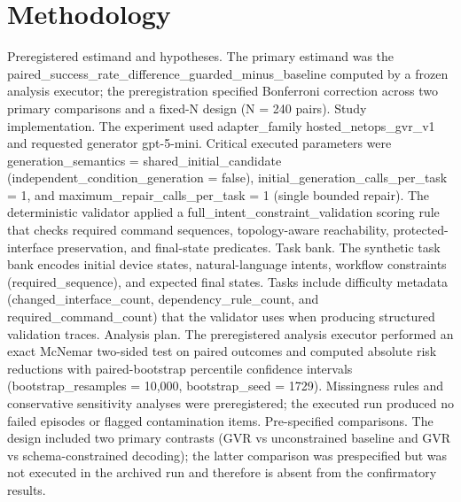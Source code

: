 \documentclass[conference]{IEEEtran}
\begin{document}
\section{Methodology}
Preregistered estimand and hypotheses. The primary estimand was the paired\_success\_rate\_difference\_guarded\_minus\_baseline computed by a frozen analysis executor; the preregistration specified Bonferroni correction across two primary comparisons and a fixed-N design (N = 240 pairs). Study implementation. The experiment used adapter\_family hosted\_netops\_gvr\_v1 and requested generator gpt-5-mini. Critical executed parameters were generation\_semantics = shared\_initial\_candidate (independent\_condition\_generation = false), initial\_generation\_calls\_per\_task = 1, and maximum\_repair\_calls\_per\_task = 1 (single bounded repair). The deterministic validator applied a full\_intent\_constraint\_validation scoring rule that checks required command sequences, topology-aware reachability, protected-interface preservation, and final-state predicates. Task bank. The synthetic task bank encodes initial device states, natural-language intents, workflow constraints (required\_sequence), and expected final states. Tasks include difficulty metadata (changed\_interface\_count, dependency\_rule\_count, and required\_command\_count) that the validator uses when producing structured validation traces. Analysis plan. The preregistered analysis executor performed an exact McNemar two-sided test on paired outcomes and computed absolute risk reductions with paired-bootstrap percentile confidence intervals (bootstrap\_resamples = 10,000, bootstrap\_seed = 1729). Missingness rules and conservative sensitivity analyses were preregistered; the executed run produced no failed episodes or flagged contamination items. Pre-specified comparisons. The design included two primary contrasts (GVR vs unconstrained baseline and GVR vs schema-constrained decoding); the latter comparison was prespecified but was not executed in the archived run and therefore is absent from the confirmatory results.
\end{document}
